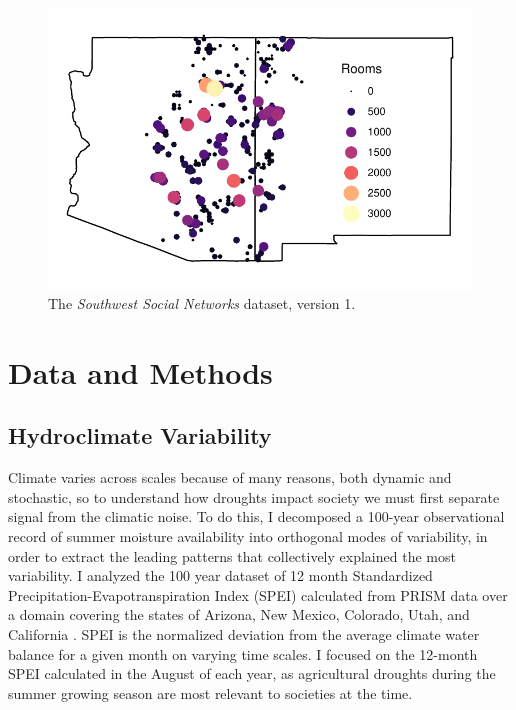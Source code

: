 \documentclass[10pt]{iopart}
\begin{document}

\begin{figure}[!htbp]
\centering
\includegraphics[width=.9\linewidth]{figures/site_distribution.pdf}
\caption{The \emph{Southwest Social Networks} dataset, version 1.} 
\label{fig:network-plot}
\end{figure}

\section*{Data and Methods}

\subsection*{Hydroclimate Variability}
Climate varies across scales because of many reasons, both dynamic and stochastic, so to understand how droughts impact society we must first separate signal from the climatic noise. To do this, I decomposed a 100-year observational record of summer moisture availability into orthogonal modes of variability, in order to extract the leading patterns that collectively explained the most variability. I analyzed the 100 year dataset of 12 month Standardized Precipitation-Evapotranspiration Index (SPEI) calculated from PRISM data over a domain covering the states of Arizona, New Mexico, Colorado, Utah, and California \parencite{daly}. SPEI is the normalized deviation from the average climate water balance for a given month on varying time scales. I focused on the 12-month SPEI calculated in the August of each year, as agricultural droughts during the summer growing season are most relevant to societies at the time.
\end{document}
